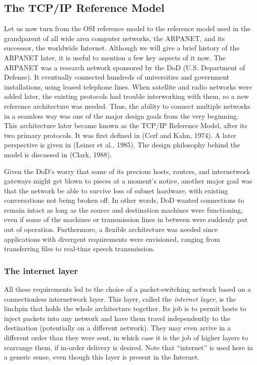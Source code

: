\documentclass[b5paper,11pt]{memoir}
\begin{document}
\subsection{The TCP/IP Reference Model}

Let us now turn from the OSI reference model to the reference model used
in the grandparent of all wide area computer networks, the ARPANET, and
its successor, the worldwide Internet. Although we will give a brief
history of the ARPANET later, it is useful to mention a few key aspects
of it now. The ARPANET was a research network sponsored by the DoD (U.S.
Department of Defense). It eventually connected hundreds of universities
and government installations, using leased telephone lines. When
satellite and radio networks were added later, the existing protocols
had trouble interworking with them, so a new reference architecture was
needed. Thus, the ability to connect multiple networks in a seamless way
was one of the major design goals from the very beginning. This
architecture later became known as the {TCP/IP Reference Model}, after
its two primary protocols. It was first defined in (Cerf and Kahn,
1974). A later perspective is given in (Leiner et al., 1985). The design
philosophy behind the model is discussed in (Clark, 1988).

Given the DoD's worry that some of its precious hosts, routers, and
internetwork gateways might get blown to pieces at a moment's notice,
another major goal was that the network be able to survive loss of
subnet hardware, with existing conversations not being broken off. In
other words, DoD wanted connections to remain intact as long as the
source and destination machines were functioning, even if some of the
machines or transmission lines in between were suddenly put out of
operation. Furthermore, a flexible architecture was needed since
applications with divergent requirements were envisioned, ranging from
transferring files to real-time speech transmission.


\subsubsection{The internet layer}

All these requirements led to the choice of a packet-switching network
based on a connectionless internetwork layer. This layer, called the
\emph{internet layer}, is the linchpin that holds the whole architecture
together. Its job is to permit hosts to inject packets into any network
and have them travel independently to the destination (potentially on a
different network). They may even arrive in a different order than they
were sent, in which case it is the job of higher layers to rearrange
them, if in-order delivery is desired. Note that ``internet'' is used
here in a generic sense, even though this layer is present in the
Internet.
\end{document}
